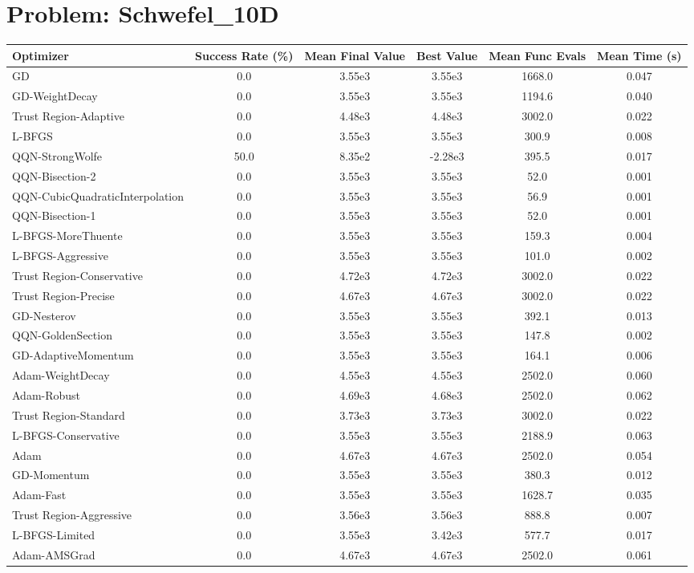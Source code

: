 \documentclass{article}
\begin{document}
\section{Problem: Schwefel\_10D}
\begin{longtable}{p{3cm}*{5}{c}}
\toprule
\textbf{Optimizer} & \textbf{Success Rate (\%)} & \textbf{Mean Final Value} & \textbf{Best Value} & \textbf{Mean Func Evals} & \textbf{Mean Time (s)} \\
\midrule
GD & 0.0 & 3.55e3 & 3.55e3 & 1668.0 & 0.047 \\
GD-WeightDecay & 0.0 & 3.55e3 & 3.55e3 & 1194.6 & 0.040 \\
Trust Region-Adaptive & 0.0 & 4.48e3 & 4.48e3 & 3002.0 & 0.022 \\
L-BFGS & 0.0 & 3.55e3 & 3.55e3 & 300.9 & 0.008 \\
QQN-StrongWolfe & 50.0 & 8.35e2 & -2.28e3 & 395.5 & 0.017 \\
QQN-Bisection-2 & 0.0 & 3.55e3 & 3.55e3 & 52.0 & 0.001 \\
QQN-CubicQuadraticInterpolation & 0.0 & 3.55e3 & 3.55e3 & 56.9 & 0.001 \\
QQN-Bisection-1 & 0.0 & 3.55e3 & 3.55e3 & 52.0 & 0.001 \\
L-BFGS-MoreThuente & 0.0 & 3.55e3 & 3.55e3 & 159.3 & 0.004 \\
L-BFGS-Aggressive & 0.0 & 3.55e3 & 3.55e3 & 101.0 & 0.002 \\
Trust Region-Conservative & 0.0 & 4.72e3 & 4.72e3 & 3002.0 & 0.022 \\
Trust Region-Precise & 0.0 & 4.67e3 & 4.67e3 & 3002.0 & 0.022 \\
GD-Nesterov & 0.0 & 3.55e3 & 3.55e3 & 392.1 & 0.013 \\
QQN-GoldenSection & 0.0 & 3.55e3 & 3.55e3 & 147.8 & 0.002 \\
GD-AdaptiveMomentum & 0.0 & 3.55e3 & 3.55e3 & 164.1 & 0.006 \\
Adam-WeightDecay & 0.0 & 4.55e3 & 4.55e3 & 2502.0 & 0.060 \\
Adam-Robust & 0.0 & 4.69e3 & 4.68e3 & 2502.0 & 0.062 \\
Trust Region-Standard & 0.0 & 3.73e3 & 3.73e3 & 3002.0 & 0.022 \\
L-BFGS-Conservative & 0.0 & 3.55e3 & 3.55e3 & 2188.9 & 0.063 \\
Adam & 0.0 & 4.67e3 & 4.67e3 & 2502.0 & 0.054 \\
GD-Momentum & 0.0 & 3.55e3 & 3.55e3 & 380.3 & 0.012 \\
Adam-Fast & 0.0 & 3.55e3 & 3.55e3 & 1628.7 & 0.035 \\
Trust Region-Aggressive & 0.0 & 3.56e3 & 3.56e3 & 888.8 & 0.007 \\
L-BFGS-Limited & 0.0 & 3.55e3 & 3.42e3 & 577.7 & 0.017 \\
Adam-AMSGrad & 0.0 & 4.67e3 & 4.67e3 & 2502.0 & 0.061 \\
\bottomrule
\end{longtable}
\end{document}
